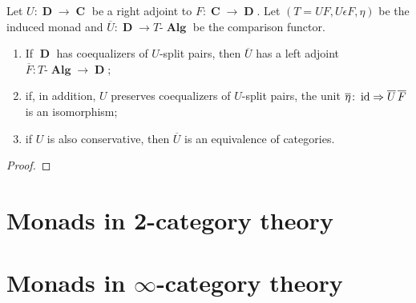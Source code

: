 \documentclass[a4paper,11pt,twoside, openany]{book}
\DeclareMathOperator{\Alg}{\mathbf{Alg}}
\DeclareMathOperator{\C}{\mathbf{C}}
\DeclareMathOperator{\D}{\mathbf{D}}
\DeclareMathOperator{\id}{id}
\theoremstyle{definition}
\theoremstyle{definition}
\theoremstyle{remark}
\begin{document}
	\begin{teo}[Beck]\label{Beck} Let $U\colon\D\to\C$ be a right adjoint to $F\colon\C\to\D$. Let $(T=UF, U\epsilon F, \eta)$ be the induced monad and $\overline{U}\colon\D\to T\mbox{-}\Alg$ be the comparison functor. 
	\begin{enumerate}
		\item If $\D$ has coequalizers of $U$-split pairs, then $\overline{U}$ has a left adjoint $\overline{F}\colon T\mbox{-}\Alg\to\D$;
		\item if, in addition, $U$ preserves coequalizers of $U$-split pairs, the unit $\overline{\eta}\colon\id\Rightarrow\overline{U}\hspace{.5mm} \overline{F}$ is an isomorphism;
		\item if $U$ is also conservative, then $\overline{U}$ is an equivalence of categories.
	\end{enumerate}
	\end{teo}
	\begin{proof}
		
	\end{proof}
	\chapter{Monads in 2-category theory}
	\chapter{Monads in $\infty$-category theory}
	
	
	
	
	\backmatter
	
\end{document}
